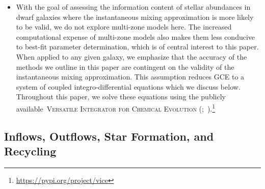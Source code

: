 \documentclass[ms.tex]{subfiles}
\begin{document}
\begin{itemize}
	\item With the goal of assessing the information content of stellar
	abundances in dwarf galaxies where the instantaneous mixing approximation
	is more likely to be valid, we do not explore multi-zone models here.
	The increased computational expense of multi-zone models also makes them
	less conducive to best-fit parameter determination, which is of central
	interest to this paper.
	When applied to any given galaxy, we emphasize that the accuracy of the
	methods we outline in this paper are contingent on the validity of the
	instantaneous mixing approximation.
	This assumption reduces GCE to a system of coupled integro-differential
	equations which we discuss below.
	Throughout this paper, we solve these equations using the publicly
	available~\textsc{Versatile Integrator for Chemical Evolution}
	(\vice;~\citealp{Johnson2020}).\footnote{
		\url{https://pypi.org/project/vice}
	}

\end{itemize}

\subsection{Inflows, Outflows, Star Formation, and Recycling}
\label{sec:onezone:gas}
\end{document}
